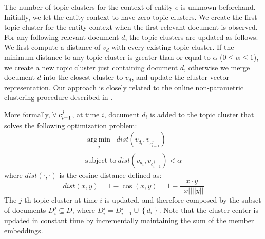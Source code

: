 \documentclass{article}
\DeclareMathOperator*{\argmin}{arg\,min}
\begin{document}
The number of topic clusters for the context of entity $e$ is unknown beforehand. Initially, we let the entity context to have zero topic clusters. 
We create the first topic cluster for the entity context when the first relevant document is observed. 
For any following relevant document $d$, the topic clusters are updated as follows.
We first compute a distance of $v_d$ with every existing topic cluster.
If the minimum distance to any topic cluster is greater than or equal to $\alpha$ ($0 \leq \alpha \leq 1$), we create a new topic cluster just containing document $d$, otherwise we merge document $d$ into the closest cluster to $v_d$, and update the cluster vector representation.
Our approach is closely related to the online non-parametric clustering procedure described in \citet{Arvind14}.


More formally, $\forall\hspace{1mm}c^j_{i-1}$, at time $i$, document $d_i$ is added to the topic cluster that solves the following optimization problem:
\begin{eqnarray}
\underset{j}{\argmin}\;\; dist(v_{d_i}, v_{c^j_{i-1}}) \nonumber\\
\text{subject to}~dist(v_{d_i}, v_{c^j_{i-1}}) < \alpha 
\end{eqnarray}
where $dist(\cdot,\cdot)$ is the cosine distance defined as: %
\begin{equation}
\label{cosine}
dist(x,y) = 1 - \cos(x,y) = 1 - \frac{x \cdot y}{||x||||y||}
\end{equation}
The $j$-th topic cluster at time $i$ is updated, and therefore composed by the subset of documents $D^j_i \subseteq D$, where $D^j_i = D^j_{i-1} \cup \left\{ {d_i}\right\}$.
Note that the cluster center is updated in constant time by incrementally maintaining the sum of the member embeddings.

\end{document}
